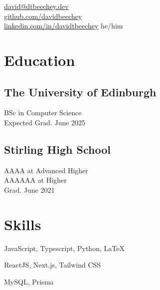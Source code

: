 \documentclass[]{hieudo-build}
\begin{document}
%
%
{
	\faEnvelope \href{mailto:david@dtbeechey.dev}{ david@dtbeechey.dev}\\
	\faGithub \href{https://github.com/davidbeechey}{ github.com/davidbeechey}\\
	\faLinkedinSquare \href{https://www.linkedin.com/in/davidtbeechey}{ linkedin.com/in/davidtbeechey}
}{he/him}

%
%
\begin{minipage}[t]{0.36\textwidth}

	\section{Education}

	\subsection{The University of Edinburgh}
	BSc in Computer Science \\
	Expected Grad. June 2025 \\
	\minisectionsep

	\subsection{Stirling High School}
	AAAA at Advanced Higher \\
	AAAAAA at Higher \\
	Grad. June 2021 \\
	\minisectionsep

	\section{Skills}
	JavaScript, Typescript, Python, \LaTeX \\
	\minisectionsep

	ReactJS, Next.js, Tailwind CSS \\
	\minisectionsep

	MySQL, Prisma \\
	\minisectionsep


\end{minipage}
\end{document}
